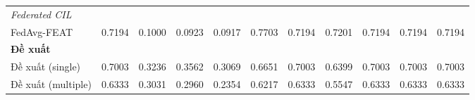 \begin{table}[H]
{\begin{tabular}{lcccccccccc}
        \hline
        \multicolumn{11}{l}{\textit{Federated CIL}} \\
        FedAvg-FEAT & \cellcolor{green!60!black}0.7194 & 0.1000 & 0.0923 & 0.0917 & \cellcolor{green!60!black}0.7703 & \cellcolor{green!60!black}0.7194 & \cellcolor{green!60!black}0.7201 & \cellcolor{green!60!black}0.7194 & \cellcolor{green!60!black}0.7194 & \cellcolor{green!60!black}0.7194 \\
        \hline
        \multicolumn{11}{l}{\textbf{Đề xuất}} \\
        Đề xuất (single) & 0.7003 & \cellcolor{green!60!black}0.3236 & \cellcolor{green!60!black}0.3562 & \cellcolor{green!60!black}0.3069 & \cellcolor{green!90!black}0.6651 & 0.7003 & \cellcolor{green!90!black}0.6399 & 0.7003 & 0.7003 & 0.7003 \\
        Đề xuất (multiple) & 0.6333 & \cellcolor{green!90!black}0.3031 & 0.2960 & 0.2354 & 0.6217 & 0.6333 & 0.5547 & 0.6333 & 0.6333 & 0.6333 \\
        \hline
    \end{tabular}}
\end{table}

